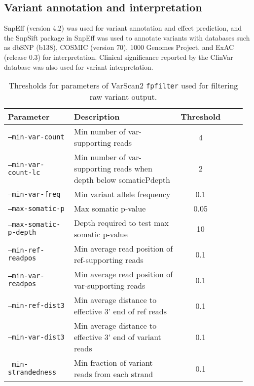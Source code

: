 \subsection{Variant annotation and interpretation}

SnpEff (version 4.2) was used for variant annotation and effect prediction, and the SnpSift package in SnpEff was used to annotate variants with databases such as dbSNP (b138), COSMIC (version 70), 1000 Genomes Project, and ExAC (release 0.3) for interpretation. Clinical significance reported by the ClinVar database was also used for variant interpretation.



\begin{table}[H]
\caption{Thresholds for parameters of VarScan2 \texttt{fpfilter} used for filtering raw variant output.}
\label{tbl:varscan_fpfilter_parameters}
\centering
      \begin{tabular}{p{0.3\linewidth}p{0.56\linewidth}cp{0.1\linewidth}}
        \hline
        Parameter & Description & Threshold
				\\
				\hline
				\texttt{--min-var-count} & Min number of var-supporting reads & 4
				\\
        \texttt{--min-var-count-lc} & Min number of var-supporting reads when depth below somaticPdepth & 2
        \\
        \texttt{--min-var-freq} & Min variant allele frequency & 0.1
				\\
        \texttt{--max-somatic-p} & Max somatic p-value & 0.05
				\\
        \texttt{--max-somatic-p-depth} & Depth required to test max somatic p-value & 10
				\\
        \texttt{--min-ref-readpos} & Min average read position of ref-supporting reads & 0.1
				\\
        \texttt{--min-var-readpos} & Min average read position of var-supporting reads & 0.1
				\\
        \texttt{--min-ref-dist3} & Min average distance to effective 3' end of ref reads & 0.1
				\\
        \texttt{--min-var-dist3} & Min average distance to effective 3' end of variant reads & 0.1
				\\
        \texttt{--min-strandedness} & Min fraction of variant reads from each strand & 0.1
				\\

\end{tabular}
\end{table}
